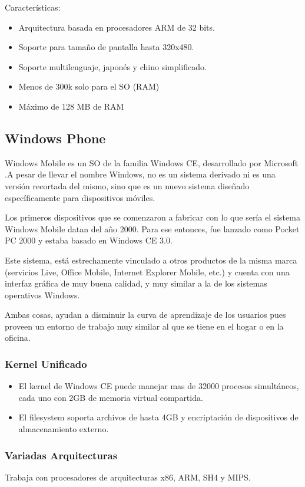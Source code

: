 Características:

\begin{itemize}
	\item Arquitectura basada en procesadores ARM de 32 bits.
	\item Soporte para tamaño de pantalla hasta 320x480.
	\item Soporte multilenguaje, japonés y chino simplificado.
	\item Menos de 300k solo para el SO (RAM)
	\item Máximo de 128 MB de RAM
\end{itemize}

\subsection*{Windows Phone}
Windows Mobile es un SO de la familia Windows CE, desarrollado por Microsoft .A pesar de llevar el nombre Windows, no es un sistema derivado ni es una versión recortada del 
mismo, sino que es un nuevo sistema diseñado específicamente para dispositivos móviles.

Los primeros dispositivos que se comenzaron a fabricar con lo que sería el sistema Windows Mobile datan del año 2000. Para ese entonces, fue lanzado como Pocket PC 2000 y 
estaba basado en Windows CE 3.0.

Este sistema, está estrechamente vinculado a otros productos de la misma marca (servicios Live, Office Mobile, Internet Explorer Mobile, etc.) y cuenta con una interfaz 
gráfica de muy buena calidad, y muy similar a la de los sistemas operativos Windows.

Ambas cosas, ayudan a disminuir la curva de aprendizaje de los usuarios pues proveen un entorno de trabajo muy similar al que se tiene en el hogar o en la oficina.

\subsubsection*{Kernel Unificado}
\begin{itemize}
	\item El kernel de Windows CE puede manejar mas de 32000 procesos simultáneos, cada uno con 2GB de memoria virtual compartida.
	\item El filesystem soporta archivos de hasta 4GB y encriptación de dispositivos de almacenamiento externo.
\end{itemize}

\subsubsection*{Variadas Arquitecturas}
Trabaja con procesadores de arquitecturas x86, ARM, SH4 y MIPS.

